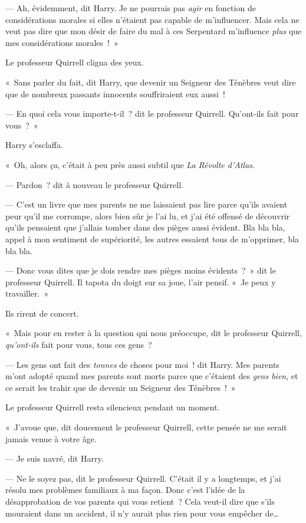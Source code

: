 --- Ah, évidemment, dit Harry. Je ne pourrais pas \emph{agir} en fonction de considérations morales si elles n'étaient pas capable de m'influencer. Mais cela ne veut pas dire que mon désir de faire du mal à ces Serpentard m'influence \emph{plus} que mes considérations morales~!~»

Le professeur Quirrell cligna des yeux.

«~Sans parler du fait, dit Harry, que devenir un Seigneur des Ténèbres veut dire que de nombreux passants innocents souffriraient eux aussi~!

--- En quoi cela vous importe-t-il~? dit le professeur Quirrell. Qu'ont-ils fait pour vous~?~»

Harry s'esclaffa.

«~Oh, alors \emph{ça}, c'était à peu près aussi subtil que \emph{La Révolte d'Atlas}.

--- Pardon~? dit à nouveau le professeur Quirrell.

--- C'est un livre que mes parents ne me laissaient pas lire parce qu'ils avaient peur qu'il me corrompe, alors bien sûr je l'ai lu, et j'ai été offensé de découvrir qu'ils pensaient que j'allais tomber dans des pièges aussi évident. Bla bla bla, appel à mon sentiment de supériorité, les autres essaient tous de m'opprimer, bla bla bla.

--- Donc vous dites que je dois rendre mes pièges moins évidents~?~» dit le professeur Quirrell. Il tapota du doigt sur sa joue, l'air pensif. «~Je peux y travailler.~»

Ils rirent de concert.

«~Mais pour en rester à la question qui nous préoccupe, dit le professeur Quirrell, \emph{qu'ont-ils} fait pour vous, tous ces gens~?

--- Les gens ont fait des \emph{tonnes} de choses pour moi~! dit Harry. Mes parents m'ont adopté quand mes parents sont morts parce que c'étaient des \emph{gens bien}, et ce serait les trahir que de devenir un Seigneur des Ténèbres~!~»

Le professeur Quirrell resta silencieux pendant un moment.

«~J'avoue que, dit doucement le professeur Quirrell, cette pensée ne me serait jamais venue à votre âge.

--- Je suis navré, dit Harry.

--- Ne le soyez pas, dit le professeur Quirrell. C'était il y a longtemps, et j'ai résolu mes problèmes familiaux à ma façon. Donc c'est l'idée de la désapprobation de vos parents qui vous retient~? Cela veut-il dire que s'ils mouraient dans un accident, il n'y aurait plus rien pour vous empêcher de…

